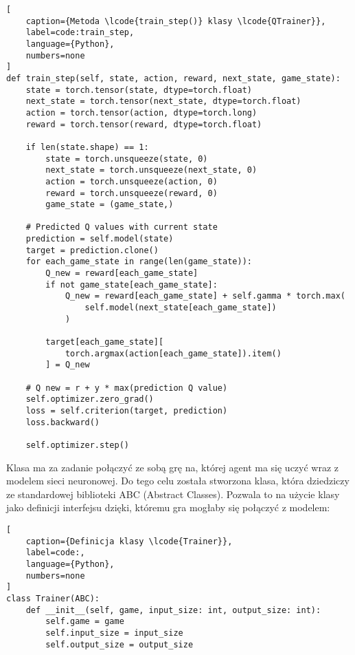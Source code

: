 \begin{onepage}
    \begin{lstlisting}[
    caption={Metoda \lcode{train_step()} klasy \lcode{QTrainer}},
    label=code:train_step,
    language={Python},
    numbers=none
]
def train_step(self, state, action, reward, next_state, game_state):
    state = torch.tensor(state, dtype=torch.float)
    next_state = torch.tensor(next_state, dtype=torch.float)
    action = torch.tensor(action, dtype=torch.long)
    reward = torch.tensor(reward, dtype=torch.float)

    if len(state.shape) == 1:
        state = torch.unsqueeze(state, 0)
        next_state = torch.unsqueeze(next_state, 0)
        action = torch.unsqueeze(action, 0)
        reward = torch.unsqueeze(reward, 0)
        game_state = (game_state,)

    # Predicted Q values with current state
    prediction = self.model(state)
    target = prediction.clone()
    for each_game_state in range(len(game_state)):
        Q_new = reward[each_game_state]
        if not game_state[each_game_state]:
            Q_new = reward[each_game_state] + self.gamma * torch.max(
                self.model(next_state[each_game_state])
            )

        target[each_game_state][
            torch.argmax(action[each_game_state]).item()
        ] = Q_new

    # Q new = r + y * max(prediction Q value)
    self.optimizer.zero_grad()
    loss = self.criterion(target, prediction)
    loss.backward()

    self.optimizer.step()

\end{lstlisting}
\end{onepage}

\clearpage


Klasa  ma za zadanie połączyć ze sobą grę na, której agent ma się uczyć wraz z modelem sieci neuronowej. Do tego celu została stworzona klasa, która dziedziczy ze standardowej biblioteki ABC (Abstract Classes). Pozwala to na użycie klasy  jako definicji interfejsu dzięki, któremu gra mogłaby się połączyć z modelem:

\begin{onepage}
    \begin{lstlisting}[
    caption={Definicja klasy \lcode{Trainer}},
    label=code:,
    language={Python},
    numbers=none
]
class Trainer(ABC):
    def __init__(self, game, input_size: int, output_size: int):
        self.game = game
        self.input_size = input_size
        self.output_size = output_size
    \end{lstlisting}
\end{onepage}

